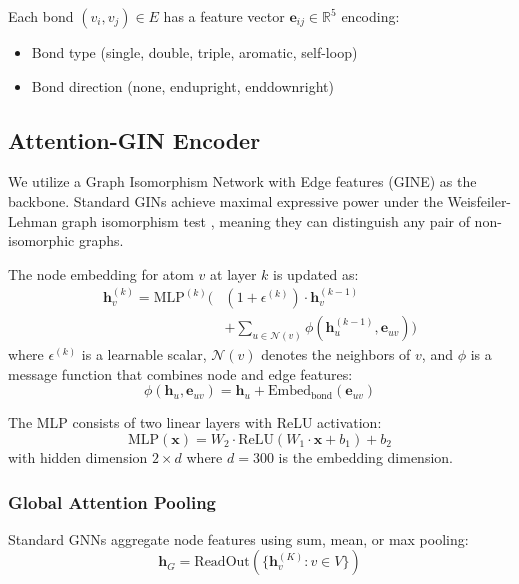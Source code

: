\documentclass[conference]{IEEEtran}
\begin{document}
Each bond $(v_i, v_j) \in E$ has a feature vector $\mathbf{e}_{ij} \in \mathbb{R}^5$ encoding:
\begin{itemize}
    \item Bond type (single, double, triple, aromatic, self-loop)
    \item Bond direction (none, endupright, enddownright)
\end{itemize}

\subsection{Attention-GIN Encoder}

We utilize a Graph Isomorphism Network with Edge features (GINE) as the backbone. Standard GINs achieve maximal expressive power under the Weisfeiler-Lehman graph isomorphism test \cite{xu2019powerful}, meaning they can distinguish any pair of non-isomorphic graphs.

The node embedding for atom $v$ at layer $k$ is updated as:
\begin{equation}
\begin{split}
    \mathbf{h}_v^{(k)} = \text{MLP}^{(k)} \Big( &(1 + \epsilon^{(k)}) \cdot \mathbf{h}_v^{(k-1)} \\
    &+ \sum_{u \in \mathcal{N}(v)} \phi(\mathbf{h}_u^{(k-1)}, \mathbf{e}_{uv}) \Big)
\end{split}
\end{equation}
where $\epsilon^{(k)}$ is a learnable scalar, $\mathcal{N}(v)$ denotes the neighbors of $v$, and $\phi$ is a message function that combines node and edge features:
\begin{equation}
    \phi(\mathbf{h}_u, \mathbf{e}_{uv}) = \mathbf{h}_u + \text{Embed}_{\text{bond}}(\mathbf{e}_{uv})
\end{equation}

The MLP consists of two linear layers with ReLU activation:
\begin{equation}
    \text{MLP}(\mathbf{x}) = W_2 \cdot \text{ReLU}(W_1 \cdot \mathbf{x} + b_1) + b_2
\end{equation}
with hidden dimension $2 \times d$ where $d = 300$ is the embedding dimension.

\subsubsection{Global Attention Pooling}

Standard GNNs aggregate node features using sum, mean, or max pooling:
\begin{equation}
    \mathbf{h}_G = \text{ReadOut}(\{\mathbf{h}_v^{(K)} : v \in V\})
\end{equation}
\end{document}
